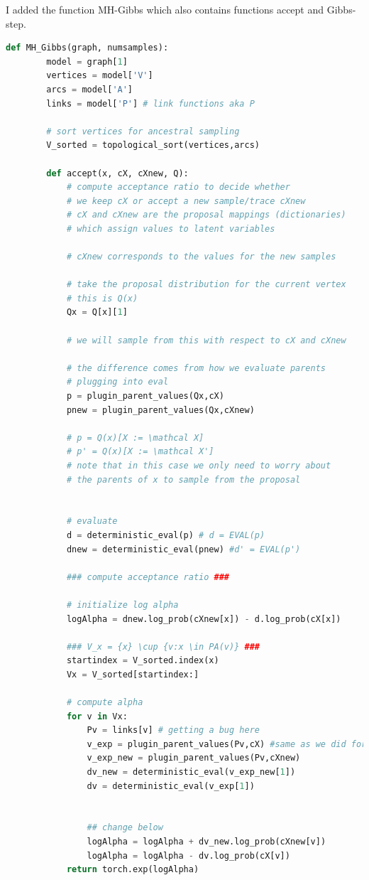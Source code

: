 \documentclass[12pt]{article}%
\theoremstyle{definition}
\begin{document}
	
	I added the function MH-Gibbs which also contains functions accept and Gibbs-step.
	\begin{lstlisting}[language=Python]
	def MH_Gibbs(graph, numsamples):
	    model = graph[1]
	    vertices = model['V']
	    arcs = model['A']
	    links = model['P'] # link functions aka P
	
	    # sort vertices for ancestral sampling
	    V_sorted = topological_sort(vertices,arcs)
	
	    def accept(x, cX, cXnew, Q):
	        # compute acceptance ratio to decide whether
	        # we keep cX or accept a new sample/trace cXnew
	        # cX and cXnew are the proposal mappings (dictionaries)
	        # which assign values to latent variables
	
	        # cXnew corresponds to the values for the new samples
	
	        # take the proposal distribution for the current vertex
	        # this is Q(x)
	        Qx = Q[x][1]
	
	        # we will sample from this with respect to cX and cXnew
	
	        # the difference comes from how we evaluate parents 
	        # plugging into eval
	        p = plugin_parent_values(Qx,cX)
	        pnew = plugin_parent_values(Qx,cXnew)
	
	        # p = Q(x)[X := \mathcal X]
	        # p' = Q(x)[X := \mathcal X']
	        # note that in this case we only need to worry about
	        # the parents of x to sample from the proposal
	
	
	        # evaluate 
	        d = deterministic_eval(p) # d = EVAL(p)
	        dnew = deterministic_eval(pnew) #d' = EVAL(p')
	
	        ### compute acceptance ratio ###
	
	        # initialize log alpha
	        logAlpha = dnew.log_prob(cXnew[x]) - d.log_prob(cX[x])
	
	        ### V_x = {x} \cup {v:x \in PA(v)} ###
	        startindex = V_sorted.index(x)
	        Vx = V_sorted[startindex:]
	
	        # compute alpha
	        for v in Vx:
	            Pv = links[v] # getting a bug here
	            v_exp = plugin_parent_values(Pv,cX) #same as we did for p and pnew
	            v_exp_new = plugin_parent_values(Pv,cXnew)
	            dv_new = deterministic_eval(v_exp_new[1])
	            dv = deterministic_eval(v_exp[1])
	
	            
	            ## change below
	            logAlpha = logAlpha + dv_new.log_prob(cXnew[v])
	            logAlpha = logAlpha - dv.log_prob(cX[v])
	        return torch.exp(logAlpha)
	

\end{lstlisting}
\end{document}
